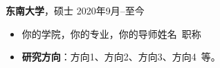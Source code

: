 \documentclass[11pt]{article}
\begin{document}
\begin{minipage}[t]{0.78\textwidth}
\begin{minipage}[t]{\textwidth}
        \vspace{0.5em}
        {\large \textbf{东南大学}}，硕士 \hfill 2020年9月--至今
        \begin{itemize}
            \item 你的学院，你的专业，你的导师姓名\ 职称
            \item \textbf{研究方向}：方向1、方向2、方向3、方向4\ 等。
        \end{itemize}
        
        \vspace{1.2em}
        \end{minipage}
    \end{minipage}
    \hfill
    \begin{minipage}[t]{0.2\textwidth}
        \vspace{2em} %
        \setlength{\fboxsep}{0pt}
    \end{minipage}
\end{document}
